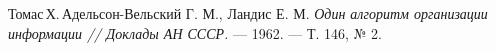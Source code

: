 \begin{thebibliography}{99}
 Томас\,Х.\,Адельсон-Вельский Г. М., Ландис Е. М. {\itshape Один алгоритм организации информации // Доклады АН СССР.} --- 1962. — Т. 146, № 2.
\end{thebibliography}
\pagebreak


